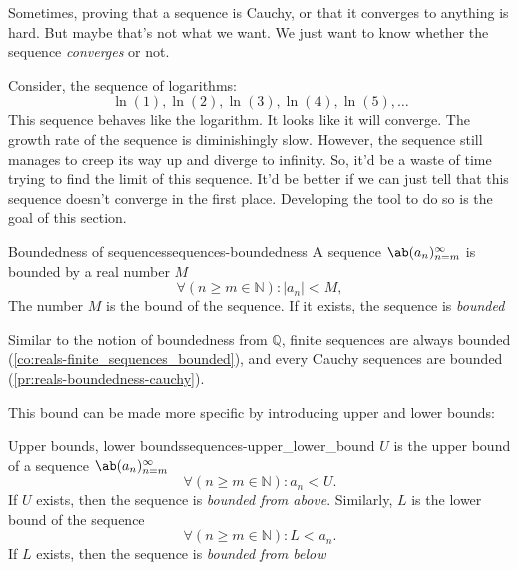Sometimes, proving that a sequence is Cauchy, or that it converges to anything is hard. But maybe that's not what we want. We just want to know whether the sequence \emph{converges} or not.

Consider, the sequence of logarithms:
\begin{equation}
  \ln(1), \ln(2), \ln(3), \ln(4), \ln(5), \dots
\end{equation}
This sequence behaves like the logarithm. It looks like it will converge. The growth rate of the sequence is diminishingly slow. However, the sequence still manages to creep its way up and diverge to infinity. So, it'd be a waste of time trying to find the limit of this sequence. It'd be better if we can just tell that this sequence doesn't converge in the first place. Developing the tool to do so is the goal of this section.

\begin{df}{Boundedness of sequences}{sequences-boundedness}
  A sequence \(\sequence{a_n}{n = m}{\infty}\) is bounded by a real number \(M\) \ifft
  \begin{equation}
    \forall (n \geq m \in \mathbb{N}): |a_n| < M,
  \end{equation}
  The number \(M\) is the bound of the sequence. If it exists, the sequence is \emph{bounded}
\end{df}

Similar to the notion of boundedness from \(\mathbb{Q}\), finite sequences are always bounded (\cref{co:reals-finite_sequences_bounded}), and every Cauchy sequences are bounded (\cref{pr:reals-boundedness-cauchy}).

This bound can be made more specific by introducing upper and lower bounds:
\begin{df}{Upper bounds, lower bounds}{sequences-upper_lower_bound}
  \(U\) is the upper bound of a sequence \(\sequence{a_n}{n = m}{\infty}\) \ifft
  \begin{equation}
    \forall (n \geq m \in \mathbb{N}) : a_n < U.
  \end{equation}
  If \(U\) exists, then the sequence is \emph{bounded from above}. Similarly, \(L\) is the lower bound of the sequence \ifft
  \begin{equation}
    \forall (n \geq m \in \mathbb{N}) : L < a_n.
  \end{equation}
  If \(L\) exists, then the sequence is \emph{bounded from below}
\end{df}

